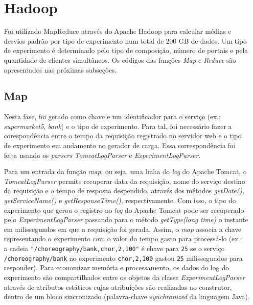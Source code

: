 \documentclass[brazil, a4paper,12pt]{article}
\begin{document}
\section{Hadoop}

Foi utilizado MapReduce através do Apache Hadoop para calcular médias e desvios
padrão por tipo de experimento num total de 200 GB de dados. Um tipo de
experimento é determinado pelo tipo de composição, número de portais e pela
quantidade de clientes simultâneos. Os códigos das funções \emph{Map} e
\emph{Reduce} são apresentados nas próximas subseções.

\subsection{Map}

Nesta fase, foi gerado como chave e um identificador para o serviço (ex.:
    \emph{supermarket5}, \emph{bank}) e o tipo de experimento. Para tal, foi
necessário fazer a corespondência entre o tempo da requisição registrado no
servidor web e o tipo de experimento em andamento no gerador de carga. Essa
correspondência foi feita usando os \emph{parsers} \emph{TomcatLogParser} e
\emph{ExperimentLogParser}.

Para um entrada da função \emph{map}, ou seja, uma linha do \emph{log} do
Apache Tomcat, o \emph{TomcatLogParser} permite recuperar data da requisição,
       nome do serviço destino da requisição e o tempo de resposta despendido,
       através dos métodos \emph{getDate()}, \emph{getServiceName()} e
       \emph{getResponseTime()}, respectivamente. Com isso, o tipo do
       experimento que gerou o registro no \emph{log} do Apache Tomcat pode ser
       recuperado pelo \emph{ExperimentLogParser} passando para o método
       \emph{getType(long time)} o instante em milissegundos em que a
       requisição foi gerada. Assim, o \emph{map} associa a chave representando
       o experimento com o valor do tempo gasto para processá-lo (ex.:\\ a
           cadeia \verb|"/choreography/bank,chor,2,100"| é chave para \verb|25|
           se o serviço\\ \verb|/choreography/bank| no experimento
           \verb|chor,2,100| gastou \verb|25| milissegundos para responder).
       Para economizar memória e processamento, os dados do log do experimento
       são compartilhados entre os objetos da classe \emph{ExperimentLogParser}
       através de atributos estáticos cujas atribuições são realizadas no
       construtor, dentro de um bloco sincronizado (palavra-chave
           \emph{synchronized} da linguagem Java).
\end{document}

